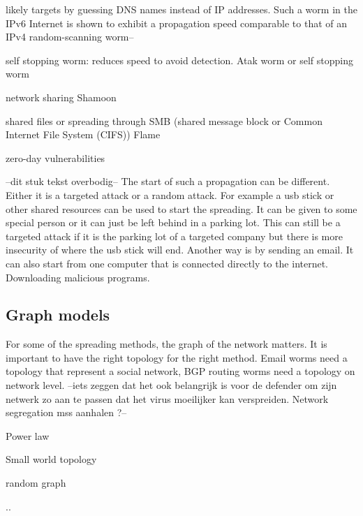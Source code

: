 \begin{description}
likely targets by guessing DNS names instead of
IP addresses. Such a worm in the IPv6 Internet is
shown to exhibit a propagation speed comparable to
that of an IPv4 random-scanning worm--
\item self stopping worm: reduces speed to avoid detection. Atak worm or self stopping worm
\item network sharing Shamoon
\item shared files or spreading through SMB (shared message block or  Common Internet File System (CIFS)) Flame
\item zero-day vulnerabilities
\end{description}

--dit stuk tekst overbodig--
The start of such a propagation can be different. Either it is a targeted attack or a random attack. For example a usb stick or other shared resources can be used to start the spreading. It can be given to some special person or it can just be left behind in a parking lot. This can still be a targeted attack if it is the parking lot of a targeted company but there is more insecurity of where the usb stick will end. Another way is by sending an email. It can also start from one computer that is connected directly to the internet. Downloading malicious programs. 

\subsection{Graph models}
For some of the spreading methods, the graph of the network matters. It is important to have the right topology for the right method. Email worms need a topology that represent a social network, BGP routing worms need a topology on network level. 
--iets zeggen dat het ook belangrijk is voor de defender om zijn netwerk zo aan te passen dat het virus moeilijker kan verspreiden. Network segregation mss aanhalen ?--

\begin{description}
\item Power law
\item Small world topology
\item random graph
\item ..
\end{description}


